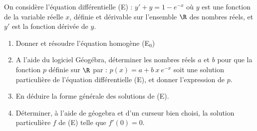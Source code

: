 \begin{exercice_cours}[\quad]{}

	On considère l’équation différentielle (E) : $y' + y = 1-e^{-x}$ où $y$ est une fonction de la variable réelle $x$, définie et dérivable sur l’ensemble $\R$ des nombres réels, et $y'$ est la fonction dérivée de $y$.

\begin{enumerate}
	\item Donner et résoudre l'équation homogène (E$_0$)  	\hfill\reponseLigne[7cm]{}    
	\item A l’aide du logiciel Géogébra, déterminer les nombres réels $a$ et $b$ pour que la fonction $p$ définie sur $\R$ par : $p(x) = a + b~x~e^{-x}$ soit une solution particulière de l'équation différentielle (E), et donner l’expression de $p$.    \hfill\reponseLigne[7cm]{} 	
	\item En déduire la forme générale des solutions de (E).  \hfill\reponseLigne[7cm]{}
	\item Déterminer, à l'aide de géogebra et d'un curseur bien choisi, la solution particulière $f$ de (E) telle que $f'(0)=0$.  \hfill\reponseLigne[7cm]{}
\end{enumerate}
\end{exercice_cours}
